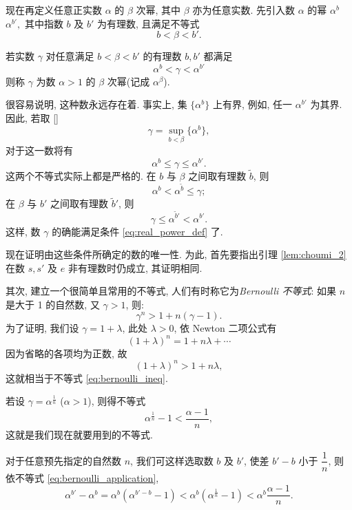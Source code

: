 现在再定义任意正实数 $\alpha$ 的 $\beta$ 次幂, 其中 $\beta$ 亦为任意实数.
先引入数 $\alpha$ 的幂
$ \alpha^b $  $\alpha^{b'}, $
其中指数 $b$ 及 $b'$ 为有理数, 且满足不等式
$$ b < \beta < b'. $$

{\kaishu
若实数 $\gamma$ 对任意满足 $b<\beta<b'$ 的有理数 $b,b'$ 都满足
\begin{equation}\label{eq:real_power_def}
\alpha^b < \gamma < \alpha^{b'}
\end{equation}
则称 $\gamma$ 为数 $\alpha > 1$
\footnotemark
的 $\beta$ 次幂(记成 $\alpha^\beta$).
}

很容易说明, 这种数永远存在着.
事实上, 集 $\{\alpha^b\}$ 上有界, 例如, 任一 $\alpha^{b'}$ 为其界.
因此, 若取 []
$$ \gamma = \sup_{b<\beta}\{\alpha^b\}, $$
对于这一数将有
$$ \alpha^b \leq \gamma \leq \alpha^{b'}. $$
这两个不等式实际上都是严格的.
在 $b$ 与 $\beta$ 之间取有理数 $\widetilde b$, 则
$$
\alpha^b<\alpha^{\widetilde b}\leq\gamma;
$$
在 $\beta$ 与 $b'$ 之间取有理数 $\widetilde b'$, 则
$$
\gamma\leq\alpha^{\widetilde b'}<\alpha^{b'}.
$$
这样, 数 $\gamma$ 的确能满足条件 \eqref{eq:real_power_def} 了.

现在证明由这些条件所确定的数的唯一性.
为此, 首先要指出引理 \ref{lem:choumi_2} 在数 $s, s'$ 及 $e$ 非有理数时仍成立, 其证明相同.

其次, 建立一个很简单且常用的不等式, 人们有时称它为\emph{Bernoulli 不等式}:
{\kaishu
如果 $n$ 是大于 1 的自然数, 又 $\gamma > 1$, 则:
\begin{equation}\label{eq:bernoulli_ineq}
\gamma^n > 1 + n(\gamma - 1).
\end{equation}
}
为了证明, 我们设 $\gamma = 1 + \lambda$, 此处 $\lambda > 0$, 依 Newton 二项公式有
$$ (1 + \lambda)^n = 1 + n\lambda + \cdots $$
因为省略的各项均为正数, 故
$$ (1 + \lambda)^n > 1 + n\lambda, $$
这就相当于不等式 \eqref{eq:bernoulli_ineq}.

若设 $\gamma = \alpha^{\frac{1}{n}}$ ($\alpha > 1$), 则得不等式
\begin{equation}\label{eq:bernoulli_application}
\alpha^{\frac{1}{n}} - 1 < \dfrac{\alpha - 1}{n},
\end{equation}
这就是我们现在就要用到的不等式.

对于任意预先指定的自然数 $n$, 我们可这样选取数 $b$ 及 $b'$, 使差 $b' - b$ 小于 $\dfrac{1}{n}$,
则依不等式 \eqref{eq:bernoulli_application},
$$ \alpha^{b'} - \alpha^b = \alpha^b(\alpha^{b' - b} - 1) < \alpha^b(\alpha^{\frac{1}{n}} - 1) < \alpha^b \dfrac{\alpha - 1}{n}. $$

